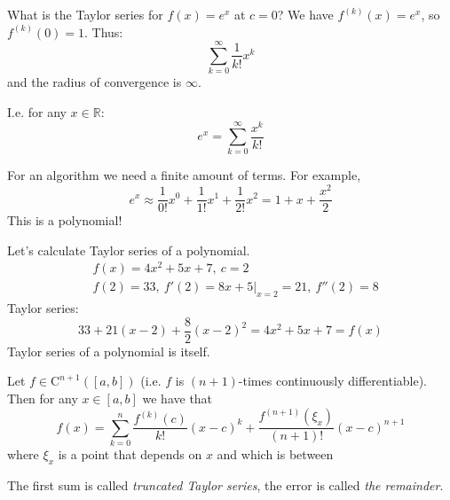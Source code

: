 \begin{example}[1]
    What is the Taylor series for $f(x) = e^x$ at $c = 0$?
    We have $f^{(k)}(x) = e^x$, so $f^{(k)}(0) = 1$.
    Thus: \[
        \sum_{k = 0}^{\infty} \frac{1}{k!} x^k
    \]
    and the radius of convergence is $\infty$.

    I.e. for any $x \in \mathbb{R}$:
    \[e^x = \sum_{k = 0}^{\infty} \frac{x^k}{k!}\]

    For an algorithm we need a finite amount of terms. For example,
    \[
        e^x \approx \frac{1}{0!} x^0 + \frac{1}{1!} x^1 + \frac{1}{2!} x^2 =
        1 + x + \frac{x^2}{2}
    \]
    This is a polynomial!
\end{example}

\begin{example}[2]
    Let's calculate Taylor series of a polynomial.
    \begin{align*}
        &
        f(x) = 4x^2 + 5x + 7,\ c = 2
        \\&
        f(2) = 33,\ f'(2) = 8x + 5\Big|_{x = 2} = 21,\ f''(2) = 8
    \end{align*}
    Taylor series:
    \[
        33 + 21(x - 2) + \frac{8}{2} (x - 2)^2 = 4x^2 + 5x + 7 = f(x)
    \]
    Taylor series of a polynomial is itself.
\end{example}

\begin{theorem}
    Let $f \in \mathrm{C}^{n + 1}([a, b])$ (i.e. $f$ is $(n+1)$-times
    continuously differentiable).
    Then for any $x \in [a, b]$ we have that 
    \[
        f(x) = \sum_{k=0}^n \frac{f^{(k)}(c)}{k!}(x - c)^k +
        \frac{f^{(n+1)}(\xi_x)}{(n+1)!} (x - c)^{n+1}
    \]
    where $\xi_x$ is a point that depends on $x$ and which is between

    The first sum is called \textit{truncated Taylor series}, the error is called \textit{the remainder}.
\end{theorem}